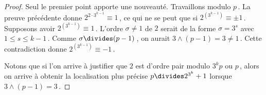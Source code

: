 \begin{proof}
	Seul le premier point apporte une nouveauté.
	Travaillons modulo $p$\,.
	La preuve précédente donne $2^{2 \cdot 3^{k-1}} \equiv 1$\,, ce qui ne se peut que si $2^{( 3^{k-1} )} \equiv \pm 1$\,.
	Supposons avoir $2^{( 3^{k-1} )} \equiv 1$\,.
	L'ordre $\sigma \neq 1$ de $2$ serait de la forme $\sigma = 3^s$ avec $1 \leq s \leq k-1$\,.
	Comme $\sigma \divides (p-1)$\,, on aurait $3 \wedge (p-1) = 3 \neq 1$\,.
	Cette contradiction donne $2^{( 3^{k-1} )} \equiv -1$\,.
	
	\medskip
	
	Notons que si l'on arrive à justifier que $2$ est d'ordre pair modulo $3^k p$ ou $p$\,, alors on arrive à obtenir la localisation plus précise $p \divides 2^{3^k} + 1$ lorsque $3 \wedge (p-1) = 3$\,.
\end{proof}
